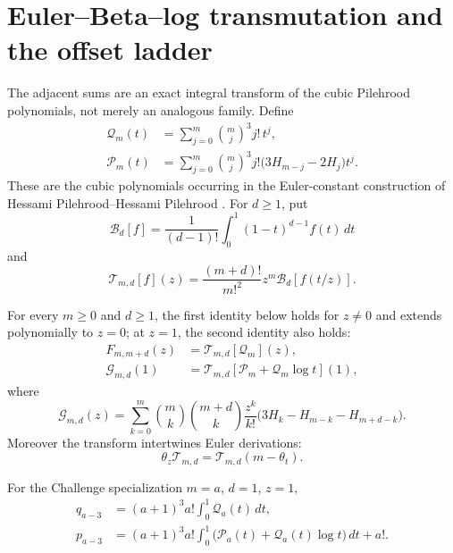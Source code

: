\section{Euler--Beta--log transmutation and the offset ladder}
\label{sec:beta-log}

The adjacent sums are an exact integral transform of the cubic Pilehrood
polynomials, not merely an analogous family.  Define
\begin{align}
 \mathcal Q_m(t)&=\sum_{j=0}^m\binom mj^3j!\,t^j,
 \label{eq:cubic-Q}\\
 \mathcal P_m(t)&=\sum_{j=0}^m\binom mj^3j!
   \bigl(3H_{m-j}-2H_j\bigr)t^j.
 \label{eq:cubic-P}
\end{align}
These are the cubic polynomials occurring in the Euler-constant construction
of Hessami Pilehrood--Hessami Pilehrood
\cite{Pilehrood2013,PilehroodBell2012}.  For \(d\ge1\), put
\begin{equation}\label{eq:Beta-operator}
 \mathcal B_d[f]=\frac1{(d-1)!}\int_0^1(1-t)^{d-1}f(t)\,dt
\end{equation}
and
\begin{equation}\label{eq:transmutation-operator}
 \mathcal T_{m,d}[f](z)=
 \frac{(m+d)!}{m!^2}z^m\mathcal B_d[f(t/z)].
\end{equation}

\begin{theorem}
\label{thm:beta-log-transform}
For every \(m\ge0\) and \(d\ge1\), the first identity below holds for
\(z\ne0\) and extends polynomially to \(z=0\); at \(z=1\), the second
identity also holds:
\begin{align}
 F_{m,m+d}(z)&=\mathcal T_{m,d}[\mathcal Q_m](z),
 \label{eq:offset-F-transform}\\
 \mathcal G_{m,d}(1)&=
 \mathcal T_{m,d}[\mathcal P_m+\mathcal Q_m\log t](1),
 \label{eq:offset-G-transform}
\end{align}
where
\begin{equation}\label{eq:Gmd-def}
 \mathcal G_{m,d}(z)=
 \sum_{k=0}^m\binom mk\binom{m+d}k\frac{z^k}{k!}
 \bigl(3H_k-H_{m-k}-H_{m+d-k}\bigr).
\end{equation}
Moreover the transform intertwines Euler derivations:
\begin{equation}\label{eq:Beta-intertwining}
 \theta_z\mathcal T_{m,d}
 =\mathcal T_{m,d}(m-\theta_t).
\end{equation}

For the Challenge specialization \(m=a\), \(d=1\), \(z=1\),
\begin{align}
 q_{a-3}&=(a+1)^3a!\int_0^1\mathcal Q_a(t)\,dt,
 \label{eq:q-Beta-transform}\\
 p_{a-3}&=(a+1)^3a!
 \int_0^1\bigl(\mathcal P_a(t)+\mathcal Q_a(t)\log t\bigr)\,dt+a!.
 \label{eq:p-Beta-transform}
\end{align}
\end{theorem}

